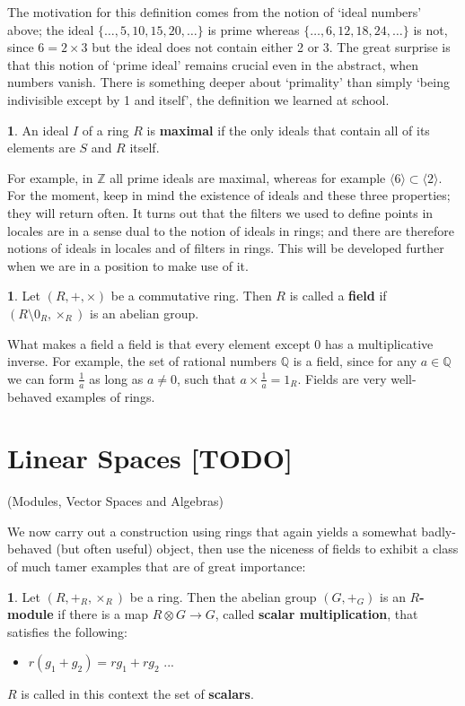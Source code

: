 \documentclass[oneside,english]{amsbook}
\numberwithin{section}{chapter}
\theoremstyle{plain}
\theoremstyle{definition}
\newtheorem{defn}[thm]{\protect\definitionname}
\providecommand{\definitionname}{Definition}
\begin{document}
The motivation for this definition comes from the notion of `ideal numbers' above; the ideal $\{\ldots, 5, 10, 15, 20, \ldots\}$ is prime whereas $\{\ldots, 6, 12, 18, 24, \ldots\}$ is not, since $6 = 2\times 3$ but the ideal does not contain either 2 or 3. The great surprise is that this notion of `prime ideal' remains crucial even in the abstract, when numbers vanish. There is something deeper about `primality' than simply `being indivisible except by 1 and itself', the definition we learned at school.

\begin{defn}
	An ideal $I$ of a ring $R$ is \textbf{maximal} if the only ideals that contain all of its elements are $S$ and $R$ itself.
\end{defn}

For example, in $\mathbb{Z}$ all prime ideals are maximal, whereas for example $\langle 6\rangle\subset \langle 2\rangle$. For the moment, keep in mind the existence of ideals and these three properties; they will return often. It turns out that the filters we used to define points in locales are in a sense dual to the notion of ideals in rings; and there are therefore notions of ideals in locales and of filters in rings. This will be developed further when we are in a position to make use of it.

\begin{defn}
	Let $(R, +, \times)$ be a commutative ring. Then $R$ is called a \textbf{field} if $(R\setminus 0_R, \times_R)$ is an abelian group.
\end{defn}

What makes a field a field is that every element except 0 has a multiplicative inverse. For example, the set of rational numbers $\mathbb{Q}$ is a field, since for any $a\in\mathbb{Q}$ we can form $\frac{1}{a}$ as long as $a\ne 0$, such that $a\times\frac{1}{a} = 1_R$. Fields are very well-behaved examples of rings. 

\section{Linear Spaces [TODO]}

(Modules, Vector Spaces and Algebras)

We now carry out a construction using rings that again yields a somewhat badly-behaved (but often useful) object, then use the niceness of fields to exhibit a class of much tamer examples that are of great importance:

\begin{defn}
	Let $(R, +_R, \times_R)$ be a ring. Then the abelian group $(G, +_G)$ is an \textbf{$R$-module} if there is a map $R\otimes G\to G$, called \textbf{scalar multiplication}, that satisfies the following:
	\begin{itemize}
		\item{$r(g_1 + g_2) = rg_1 + rg_2$}
		...
	\end{itemize}
	$R$ is called in this context the set of \textbf{scalars}.
\end{defn}
\end{document}
